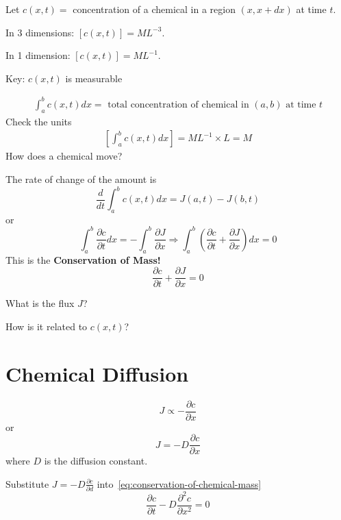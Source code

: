 \documentclass[
	date={September 4{,} 2024}
]{math486notes}
\begin{document}
Let $c(x,t) = $ concentration of a chemical in a region $(x, x+dx)$ at time $t$.

In 3 dimensions: $[c(x,t)] = ML^{-3}$.

In 1 dimension: $[c(x,t)] = ML^{-1}$.

Key: $c(x,t)$ is measurable

\begin{equation*}
\begin{aligned}
	\int_{a}^{b} c(x,t)dx = \mbox{ total concentration of chemical in } (a, b) \mbox{ at time }t
\end{aligned}
\end{equation*}
Check the units
\begin{equation*}
\begin{aligned}
	\left[ \int_{a}^{b} c(x,t)dx \right] = ML^{-1}\times L = M
\end{aligned}
\end{equation*}
How does a chemical move?

The rate of change of the amount is
\[ \frac{d}{dt}\int_{a}^{b} c(x,t)dx = J(a,t) - J(b,t) \]
or
\[ \int_{a}^{b} \frac{\partial c}{\partial t}dx = -\int_{a}^{b} \frac{\partial J}{\partial x} \Rightarrow \int_{a}^{b} \left( \frac{\partial c}{\partial t} + \frac{\partial J}{\partial x} \right)dx = 0 \]
This is the \textbf{Conservation of Mass!}
\begin{equation}
	\frac{\partial c}{\partial t} + \frac{\partial J}{\partial x} = 0
	\label{eq:conservation-of-chemical-mass}
\end{equation}

What is the flux $J$?

How is it related to $c(x,t)$?

\section{Chemical Diffusion}\label{sec:chemical-diffusion}
\[ J \propto -\frac{\partial c}{\partial x} \]
or
\[ J = -D\frac{\partial c}{\partial x} \]
where $D$ is the diffusion constant.

Substitute $J=-D\frac{\partial c}{\partial d}$ into~\eqref{eq:conservation-of-chemical-mass}
\begin{equation}
	\frac{\partial c}{\partial t} - D\frac{\partial^{2} c}{\partial x^{2}} = 0
	\label{eq:diffusion}
\end{equation}
\end{document}

